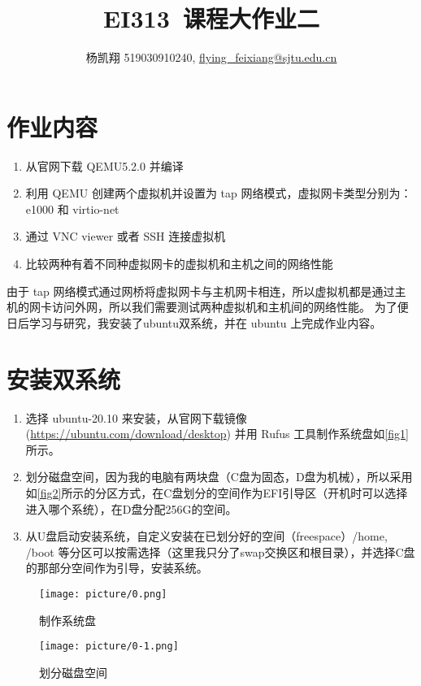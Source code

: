 \documentclass[UTF8,12pt]{ctexart}
\title{\heiti \textbf{EI313\ 课程大作业二}}
\author{\kaishu 杨凯翔 519030910240, \href{mailto: flying_feixiang@sjtu.edu.cn}{\underline{flying\_feixiang@sjtu.edu.cn}}}
\numberwithin{equation}{section}
\begin{document}
\maketitle

\thispagestyle{fancy}
\fancyhead{}
\lfoot{}
\rfoot{\thepage}
\renewcommand{\headrulewidth}{0.4pt}
\renewcommand{\footrulewidth}{0.4pt}

\heiti
\section{作业内容}
\begin{enumerate}
    \item 从官网下载 QEMU5.2.0 并编译
    \item 利用 QEMU 创建两个虚拟机并设置为 tap 网络模式，虚拟网卡类型分别为：e1000 和 virtio-net
    \item 通过 VNC viewer 或者 SSH 连接虚拟机
    \item 比较两种有着不同种虚拟网卡的虚拟机和主机之间的网络性能
\end{enumerate}
\indent 由于 tap 网络模式通过网桥将虚拟网卡与主机网卡相连，所以虚拟机都是通过主机的网卡访问外网，所以我们需要测试两种虚拟机和主机间的网络性能。
为了便日后学习与研究，我安装了ubuntu双系统，并在 ubuntu 上完成作业内容。
\section{安装双系统}
\begin{enumerate}
    \item 选择 ubuntu-20.10 来安装，从官网下载镜像 (\url{https://ubuntu.com/download/desktop}) 并用 Rufus 工具制作系统盘如\autoref{fig1}所示。
    \item 划分磁盘空间，因为我的电脑有两块盘（C盘为固态，D盘为机械），所以采用如\autoref{fig2}所示的分区方式，在C盘划分的空间作为EFI引导区（开机时可以选择进入哪个系统），在D盘分配256G的空间。
    \item 从U盘启动安装系统，自定义安装在已划分好的空间（freespace）/home, /boot 等分区可以按需选择（这里我只分了swap交换区和根目录），并选择C盘的那部分空间作为引导，安装系统。
\end{enumerate}
\begin{figure}[H]
    \centering
    \texttt{[image: picture/0.png]}
    \caption{制作系统盘}
    \label{fig1}
\end{figure}
\begin{figure}[H]
    \centering
    \texttt{[image: picture/0-1.png]}
    \caption{划分磁盘空间}
    \label{fig2}
\end{figure}
\end{document}
